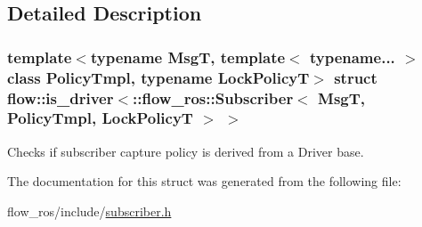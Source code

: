 \subsection{Detailed Description}
\subsubsection*{template$<$typename MsgT, template$<$ typename... $>$ class Policy\+Tmpl, typename Lock\+PolicyT$>$\newline
struct flow\+::is\+\_\+driver$<$\+::flow\+\_\+ros\+::\+Subscriber$<$ Msg\+T, Policy\+Tmpl, Lock\+Policy\+T $>$ $>$}

Checks if subscriber capture policy is derived from a Driver base. 

The documentation for this struct was generated from the following file\+:\begin{DoxyCompactItemize}
\item 
flow\+\_\+ros/include/\hyperlink{subscriber_8h}{subscriber.\+h}\end{DoxyCompactItemize}
